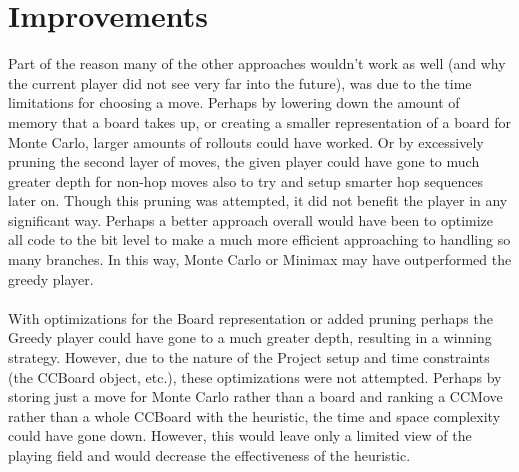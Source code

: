 \documentclass[paper=a4, fontsize=11pt]{scrartcl}
\numberwithin{equation}{section}		%
\numberwithin{figure}{section}			%
\numberwithin{table}{section}				%
\begin{document}
\section{Improvements}
Part of the reason many of the other approaches wouldn't work as well (and why the current player did not see very far into the future), was due to the time limitations for choosing a move. Perhaps by lowering down the amount of memory that a board takes up, or creating a smaller representation of a board for Monte Carlo, larger amounts of rollouts could have worked. Or by excessively pruning the second layer of moves, the given player could have gone to much greater depth for non-hop moves also to try and setup smarter hop sequences later on. Though this pruning was attempted, it did not benefit the player in any significant way. Perhaps a better approach overall would have been to optimize all code to the bit level to make a much more efficient approaching to handling so many branches. In this way, Monte Carlo or Minimax may have outperformed the greedy player.
\\\\
With optimizations for the Board representation or added pruning perhaps the Greedy player could have gone to a much greater depth, resulting in a winning strategy. However, due to the nature of the Project setup and time constraints (the CCBoard object, etc.), these optimizations were not attempted. Perhaps by storing just a move for Monte Carlo rather than a board and ranking a CCMove rather than a whole CCBoard with the heuristic, the time and space complexity could have gone down. However, this would leave only a limited view of the playing field and would decrease the effectiveness of the heuristic.

\end{document}
